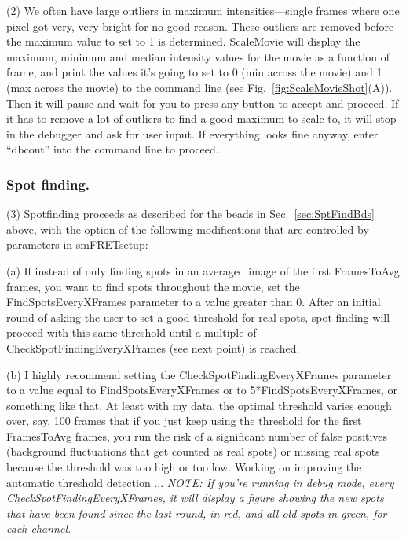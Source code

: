 \documentclass[11pt]{article}
\begin{document}
\noindent (2) We often have large outliers in maximum intensities---single frames where one pixel got very, very bright for no good reason.  These outliers are removed before the maximum value to set to 1 is determined.  ScaleMovie will display the maximum, minimum and median intensity values for the movie as a function of frame, and print the values it's going to set to 0 (min across the movie) and 1 (max across the movie) to the command line (see Fig.~\ref{fig:ScaleMovieShot}(A)).  Then it will pause and wait for you to press any button to accept and proceed.  If it has to remove a lot of outliers to find a good maximum to scale to, it will stop in the debugger and ask for user input.  If everything looks fine anyway, enter ``dbcont'' into the command line to proceed.

\subsubsection{Spot finding.}

\noindent (3) Spotfinding proceeds as described for the beads in Sec.~\ref{sec:SptFindBds} above, with the option of the following modifications that are controlled by parameters in smFRETsetup:

(a) If instead of only finding spots in an averaged image of the first FramesToAvg frames, you want to find spots throughout the movie, set the FindSpotsEveryXFrames parameter to a value greater than 0.  After an initial round of asking the user to set a good threshold for real spots, spot finding will proceed with this same threshold until a multiple of CheckSpotFindingEveryXFrames (see next point) is reached.

(b) I highly recommend setting the CheckSpotFindingEveryXFrames parameter to a value equal to FindSpotsEveryXFrames or to 5*FindSpotsEveryXFrames, or something like that.  At least with my data, the optimal threshold varies enough over, say, 100 frames that if you just keep using the threshold for the first FramesToAvg frames, you run the risk of a significant number of false positives (background fluctuations that get counted as real spots) or missing real spots because the threshold was too high or too low.  Working on improving the automatic threshold detection ... {\it NOTE: If you're running in debug mode, every CheckSpotFindingEveryXFrames, it will display a figure showing the new spots that have been found since the last round, in red, and all old spots in green, for each channel. }\\
\end{document}

